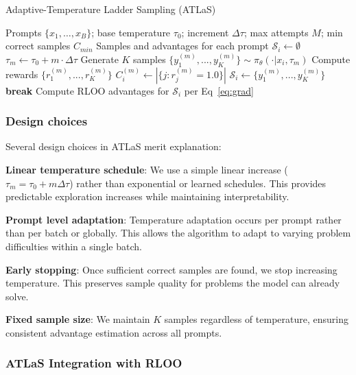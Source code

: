 \documentclass{article}
\begin{document}
\begin{algorithm}[H]
\caption{Adaptive-Temperature Ladder Sampling (ATLaS)}
\label{alg:atlas}
\begin{algorithmic}[1]
\Require Prompts $\{x_1, \ldots, x_B\}$; base temperature $\tau_0$; increment $\Delta\tau$; max attempts $M$; min correct samples $C_{min}$
\Ensure Samples and advantages for each prompt
    \State $\mathcal{S}_i \gets \emptyset$ 
        \State $\tau_m \gets \tau_0 + m \cdot \Delta\tau$
        \State Generate $K$ samples $\{y_1^{(m)}, ..., y_K^{(m)}\} \sim \pi_\theta(\cdot|x_i, \tau_m)$
        \State Compute rewards $\{r_1^{(m)}, ..., r_K^{(m)}\}$
        \State $C_i^{(m)} \gets |\{j : r_j^{(m)} = 1.0\}|$ 
            \State $\mathcal{S}_i \gets \{y_1^{(m)}, ..., y_K^{(m)}\}$
            \State \textbf{break}
        \EndIf
    \EndFor
    \State Compute RLOO advantages for $\mathcal{S}_i$ per Eq~\ref{eq:grad}
\EndFor
\end{algorithmic}
\end{algorithm}

\subsubsection{Design choices}

Several design choices in ATLaS merit explanation:

\textbf{Linear temperature schedule}: We use a simple linear increase ($\tau_m = \tau_0 + m\Delta\tau$) rather than exponential or learned schedules. This provides predictable exploration increases while maintaining interpretability.

\textbf{Prompt level adaptation}: Temperature adaptation occurs per prompt rather than per batch or globally. This allows the algorithm to adapt to varying problem difficulties within a single batch.

\textbf{Early stopping}: Once sufficient correct samples are found, we stop increasing temperature. This preserves sample quality for problems the model can already solve.

\textbf{Fixed sample size}: We maintain $K$ samples regardless of temperature, ensuring consistent advantage estimation across all prompts.

\subsubsection{ATLaS Integration with RLOO}
\end{document}

